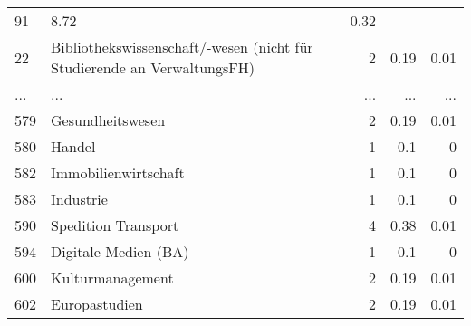 \begin{longtable}{lXrrr}
          \num{91} &
          \num[round-mode=places,round-precision=2]{8.72} &
          \num[round-mode=places,round-precision=2]{0.32} \\
        22 & \multicolumn{1}{X}{Bibliothekswissenschaft/-wesen (nicht für Studierende an VerwaltungsFH)} & %
          \num{2} &
          \num[round-mode=places,round-precision=2]{0.19} &
          \num[round-mode=places,round-precision=2]{0.01} \\
       ... & ... & ... & ... & ... \\
        579 & \multicolumn{1}{X}{Gesundheitswesen} & %
          \num{2} &
          \num[round-mode=places,round-precision=2]{0.19} &
          \num[round-mode=places,round-precision=2]{0.01} \\

        580 & \multicolumn{1}{X}{Handel} & %
          \num{1} &
          \num[round-mode=places,round-precision=2]{0.1} &
          \num[round-mode=places,round-precision=2]{0} \\

        582 & \multicolumn{1}{X}{Immobilienwirtschaft} & %
          \num{1} &
          \num[round-mode=places,round-precision=2]{0.1} &
          \num[round-mode=places,round-precision=2]{0} \\

        583 & \multicolumn{1}{X}{Industrie} & %
          \num{1} &
          \num[round-mode=places,round-precision=2]{0.1} &
          \num[round-mode=places,round-precision=2]{0} \\

        590 & \multicolumn{1}{X}{Spedition Transport} & %
          \num{4} &
          \num[round-mode=places,round-precision=2]{0.38} &
          \num[round-mode=places,round-precision=2]{0.01} \\

        594 & \multicolumn{1}{X}{Digitale Medien (BA)} & %
          \num{1} &
          \num[round-mode=places,round-precision=2]{0.1} &
          \num[round-mode=places,round-precision=2]{0} \\

        600 & \multicolumn{1}{X}{Kulturmanagement} & %
          \num{2} &
          \num[round-mode=places,round-precision=2]{0.19} &
          \num[round-mode=places,round-precision=2]{0.01} \\

        602 & \multicolumn{1}{X}{Europastudien} & %
          \num{2} &
          \num[round-mode=places,round-precision=2]{0.19} &
          \num[round-mode=places,round-precision=2]{0.01} \\


\end{longtable}
